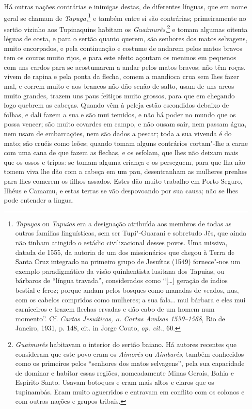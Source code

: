  Há outras nações contrárias e inimigas destas, de diferentes línguas,
que em nome geral se chamam de \textit{Tapuya},\footnote{ \textit{Tapuyas} 
ou \textit{Tapuias} era a designação atribuída aos
membros de todas as outras famílias linguísticas, sem ser Tupi"-Guarani
e sobretudo Jês, que ainda não tinham atingido o estádio
civilizacional desses povos. Uma missiva, datada de 1555, da autoria
de um dos missionários que chegou à Terra de Santa Cruz integrado no
primeiro grupo de Jesuítas (1549) fornece"-nos um exemplo paradigmático
da visão quinhentista lusitana dos Tapuias, ou bárbaros de ``língua
travada'', considerados como ``[\ldots{}] geração de índios bestial e feroz;
porque andam pelos bosques como manadas de veados, nus, com os cabelos
compridos como mulheres; a sua fala\ldots{} mui bárbara e eles mui
carniceiros e trazem flechas ervadas e dão cabo de um homem num
momento''. Cf. \textit{Cartas Jesuíticas, \textsc{ii}. Cartas Avulsas
1550--1568}, Rio de Janeiro, 1931, p. 148, cit. in Jorge Couto,
\textit{op. cit.}, 60.} e também entre si são contrárias;
primeiramente no sertão vizinho aos Tupinaquins habitam os
\textit{Guaimurês},\footnote{ \textit{Guaimurês} habitavam o
interior do sertão baiano. Há autores recentes que consideram que este
povo eram os \textit{Aimorés} ou \textit{Aimbarés}, também conhecidos
como os primeiros pelos ``senhores dos matos selvagens'', pela sua
capacidade de dominar e habitar essas regiões, nomeadamente Minas
Gerais, Bahia e Espírito Santo. Usavam botoques e eram mais altos e
claros que os tupinambás. Eram muito aguerridos e entravam em conflito
com os colonos e com outras nações e grupos tribais.} e tomam
algumas oitenta léguas de costa, e para o sertão quanto querem, são
senhores dos matos selvagens, muito encorpados, e pela continuação e
costume de andarem pelos matos bravos tem os couros muito rijos, e para
este efeito açoutam os meninos em pequenos com uns cardos para se
acostumarem a andar pelos matos bravos; não têm roças, vivem de rapina
e pela ponta da flecha, comem a mandioca crua sem lhes fazer mal, e
correm muito e aos brancos não dão senão de salto, usam de uns arcos
muito grandes, trazem uns paus feitiços muito grossos, para que em
chegando logo quebrem as cabeças. Quando vêm à peleja estão escondidos
debaixo de folhas, e dali fazem a sua e são mui temidos, e não há poder
no mundo que os possa vencer; são muito covardes em campo, e não ousam
sair, nem passam água, nem usam de embarcações, nem são dados a pescar;
toda a sua vivenda é do mato; são cruéis como leões; quando tomam
alguns contrários cortam"-lhe a carne com uma cana de que fazem as
flechas, e os esfolam, que lhes não deixam mais que os ossos e tripas:
se tomam alguma criança e os perseguem, para que lha não tomem viva lhe
dão com a cabeça em um pau, desentranham as mulheres prenhes para lhes
comerem os filhos assados. Estes dão muito trabalho em Porto Seguro,
Ilhéus e Camamu, e estas terras se vão despovoando por sua causa; não
se lhes pode entender a língua. 

